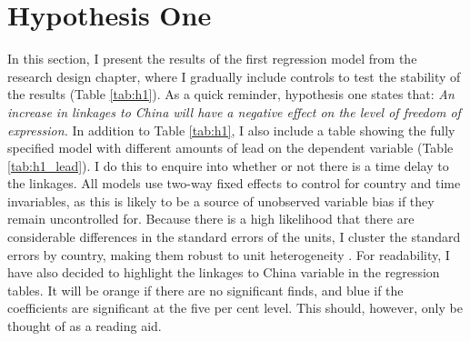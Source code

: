 \section{Hypothesis One} \label{sec:h1}
In this section, I present the results of the first regression model from the research design chapter, where I gradually include controls to test the stability of the results (Table \ref{tab:h1}). As a quick reminder, hypothesis one states that: \textit{An increase in linkages to China will have a negative effect on the level of freedom of expression.} In addition to Table \ref{tab:h1}, I also include a table showing the fully specified model with different amounts of lead on the dependent variable (Table \ref{tab:h1_lead}). I do this to enquire into whether or not there is a time delay to the linkages. All models use two-way fixed effects to control for country and time invariables, as this is likely to be a source of unobserved variable bias if they remain uncontrolled for. Because there is a high likelihood that there are considerable differences in the standard errors of the units, I cluster the standard errors by country, making them robust to unit heterogeneity \citep{moulton_random_1986, abadie_when_2023, huntington-klein_effect_2022}. For readability, I have also decided to highlight the linkages to China variable in the regression tables. It will be orange if there are no significant finds, and blue if the coefficients are significant at the five per cent level. This should, however, only be thought of as a reading aid. 

